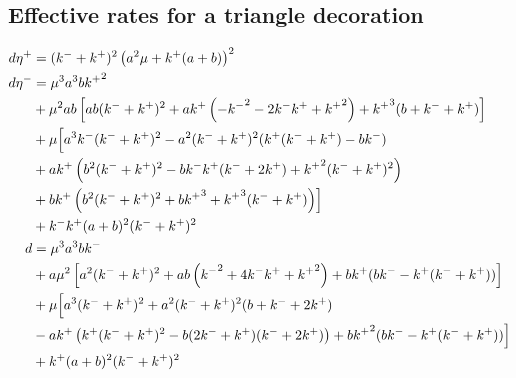 \documentclass[amsmath, preprintnumbers, 10pt, twocolumn, pre, bibliograpy]{revtex4-1}
\begin{document}
\begin{widetext}

\section{Effective rates for a triangle decoration}\label{app:eff-rates}

\begin{align}
d \eta^+ &= ({k^-}+{k^+})^2 \left(a^2 \mu  +{k^+} (a+b)\right)^2\\
d \eta^-  &=  \mu^3 a^3 b  {k^+}^2 \notag \\ 
&+  \mu  ^2 a b \left[a b ({k^-}+{k^+})^2+a {k^+} \left(-{k^-}^2-2 {k^-} {k^+}+{k^+}^2\right)+{k^+}^3 (b+{k^-}+{k^+})\right] \notag \\ 
&+\mu \Bigl[ a^3 {k^-} ({k^-}+{k^+})^2-a^2 ({k^-}+{k^+})^2 ({k^+} ({k^-}+{k^+})-b {k^-}) \notag \\
& +a {k^+} \left(b^2 ({k^-}+{k^+})^2-b {k^-} {k^+} ({k^-}+2 {k^+})+{k^+}^2 ({k^-}+{k^+})^2\right) \notag \\ 
&+b {k^+} \left(b^2 ({k^-}+{k^+})^2+b {k^+}^3+{k^+}^3 ({k^-}+{k^+})\right)\Bigr] \notag \\ 
& +{k^-} {k^+} (a+b)^2 ({k^-}+{k^+})^2 \\
d &= \mu^3 a^3 b  {k^-}\notag \\
&+a \mu  ^2 \left[a^2 ({k^-}+{k^+})^2+a b \left({k^-}^2+4 {k^-} {k^+}+{k^+}^2\right)+b {k^+} (b {k^-}-{k^+} ({k^-}+{k^+}))\right] \notag \\ 
&+\mu   \Bigl[ a^3 ({k^-}+{k^+})^2+a^2 ({k^-}+{k^+})^2 (b+{k^-}+2 {k^+}) \notag \\
&-a {k^+} \left({k^+} ({k^-}+{k^+})^2-b (2 {k^-}+{k^+}) ({k^-}+2 {k^+})\right)+b {k^+}^2 (b {k^-}-{k^+} ({k^-}+{k^+}))\Bigr] \notag \\ 
&+{k^+} (a+b)^2 ({k^-}+{k^+})^2
\end{align}
\end{widetext}
\end{document}
